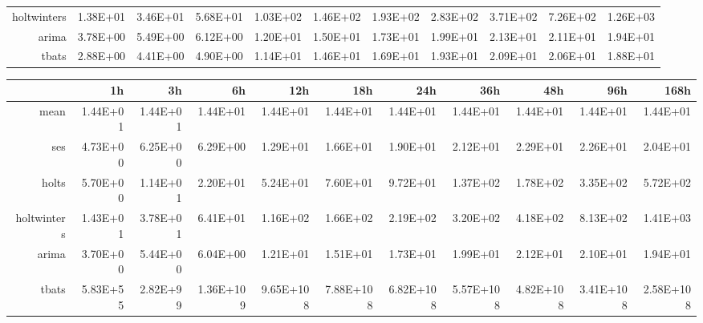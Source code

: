 \begin{landscape}
\begin{table}[ht]
\begin{tabular}{rrrrrrrrrrr}
  holtwinters & 1.38E+01 & 3.46E+01 & 5.68E+01 & 1.03E+02 & 1.46E+02 & 1.93E+02 & 2.83E+02 & 3.71E+02 & 7.26E+02 & 1.26E+03 \\ 
  arima & 3.78E+00 & 5.49E+00 & 6.12E+00 & 1.20E+01 & 1.50E+01 & 1.73E+01 & 1.99E+01 & 2.13E+01 & 2.11E+01 & 1.94E+01 \\ 
  tbats & 2.88E+00 & 4.41E+00 & 4.90E+00 & 1.14E+01 & 1.46E+01 & 1.69E+01 & 1.93E+01 & 2.09E+01 & 2.06E+01 & 1.88E+01 \\ 
   \hline
\end{tabular}
\end{table}
\begin{table}[ht]
\centering
\begin{tabular}{rrrrrrrrrrr}
  \hline
 & 1h & 3h & 6h & 12h & 18h & 24h & 36h & 48h & 96h & 168h \\ 
  \hline
mean & 1.44E+01 & 1.44E+01 & 1.44E+01 & 1.44E+01 & 1.44E+01 & 1.44E+01 & 1.44E+01 & 1.44E+01 & 1.44E+01 & 1.44E+01 \\ 
  ses & 4.73E+00 & 6.25E+00 & 6.29E+00 & 1.29E+01 & 1.66E+01 & 1.90E+01 & 2.12E+01 & 2.29E+01 & 2.26E+01 & 2.04E+01 \\ 
  holts & 5.70E+00 & 1.14E+01 & 2.20E+01 & 5.24E+01 & 7.60E+01 & 9.72E+01 & 1.37E+02 & 1.78E+02 & 3.35E+02 & 5.72E+02 \\ 
  holtwinters & 1.43E+01 & 3.78E+01 & 6.41E+01 & 1.16E+02 & 1.66E+02 & 2.19E+02 & 3.20E+02 & 4.18E+02 & 8.13E+02 & 1.41E+03 \\ 
  arima & 3.70E+00 & 5.44E+00 & 6.04E+00 & 1.21E+01 & 1.51E+01 & 1.73E+01 & 1.99E+01 & 2.12E+01 & 2.10E+01 & 1.94E+01 \\ 
  tbats & 5.83E+55 & 2.82E+99 & 1.36E+109 & 9.65E+108 & 7.88E+108 & 6.82E+108 & 5.57E+108 & 4.82E+108 & 3.41E+108 & 2.58E+108 \\ 
   \hline
\end{tabular}
\end{table}

\end{landscape}







